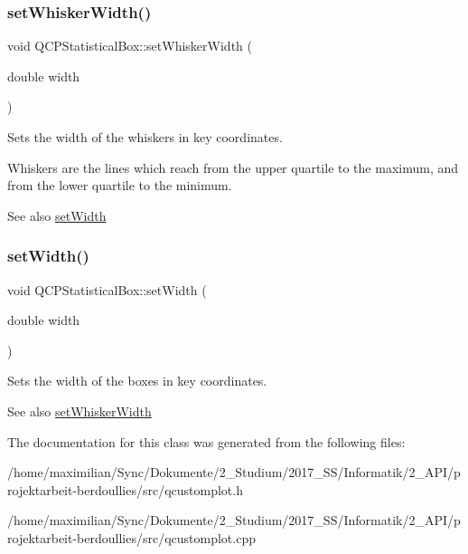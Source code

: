 \subsubsection{\texorpdfstring{set\+Whisker\+Width()}{setWhiskerWidth()}}
{\footnotesize\ttfamily void Q\+C\+P\+Statistical\+Box\+::set\+Whisker\+Width (\begin{DoxyParamCaption}\item[{double}]{width }\end{DoxyParamCaption})}

Sets the width of the whiskers in key coordinates.

Whiskers are the lines which reach from the upper quartile to the maximum, and from the lower quartile to the minimum.

\begin{DoxySeeAlso}{See also}
\hyperlink{class_q_c_p_statistical_box_a0b62775bd67301b1eba5c785f2b26f14}{set\+Width} 
\end{DoxySeeAlso}
\mbox{\label{class_q_c_p_statistical_box_a0b62775bd67301b1eba5c785f2b26f14}} 
\subsubsection{\texorpdfstring{set\+Width()}{setWidth()}}
{\footnotesize\ttfamily void Q\+C\+P\+Statistical\+Box\+::set\+Width (\begin{DoxyParamCaption}\item[{double}]{width }\end{DoxyParamCaption})}

Sets the width of the boxes in key coordinates.

\begin{DoxySeeAlso}{See also}
\hyperlink{class_q_c_p_statistical_box_adf378812446bd66f34d1f7f293d991cd}{set\+Whisker\+Width} 
\end{DoxySeeAlso}


The documentation for this class was generated from the following files\+:\begin{DoxyCompactItemize}
\item 
/home/maximilian/\+Sync/\+Dokumente/2\+\_\+\+Studium/2017\+\_\+\+S\+S/\+Informatik/2\+\_\+\+A\+P\+I/projektarbeit-\/berdoullies/src/qcustomplot.\+h\item 
/home/maximilian/\+Sync/\+Dokumente/2\+\_\+\+Studium/2017\+\_\+\+S\+S/\+Informatik/2\+\_\+\+A\+P\+I/projektarbeit-\/berdoullies/src/qcustomplot.\+cpp\end{DoxyCompactItemize}
